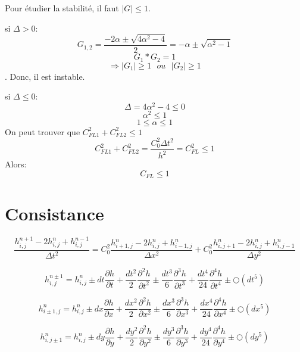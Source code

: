 \documentclass[a4paper,10pt]{report} %
\begin{document}
Pour étudier la stabilité, il faut $\big|G\big|\leq 1$.

si $\Delta > 0$:
$$G_{1,2}=\frac{-2\alpha\pm\sqrt{4\alpha^{2}-4}}{2}=-\alpha\pm\sqrt{\alpha^{2}-1}$$
$$G_{1}*G_{2}=1$$ 
$$\Longrightarrow\big|G_{1}\big|\geq1\,\,\,\,ou\,\,\,\,\big|G_{2}\big|\geq1$$. Donc, il est instable.

si $\Delta \leq 0$:
$$\Delta=4\alpha^{2}-4\leq0$$
$$\alpha^{2}\leq1$$
$$1\leq \alpha\leq1$$ On peut trouver que $C_{FL1}^{2}+C_{FL2}^{2}\leq 1 $
$$ C_{FL1}^{2}+C_{FL2}^{2}=\frac{C_{0}^{2}\Delta t^{2}}{h^{2}}=C_{FL}^{2}\leq 1$$ 
Alors:
$$C_{FL}\leq1$$



\section{Consistance}

\begin{equation}\frac{h^{n+1}_{i,j}-2h^{n}_{i,j}+h^{n-1}_{i,j}}{\Delta t^{2}}=C^{2}_{0}\frac{h^{n}_{i+1,j}-2h^{n}_{i,j}+h^{n}_{i-1,j}}{\Delta x^{2}}+C^{2}_{0}\frac{h^{n}_{i,j+1}-2h^{n}_{i,j}+h^{n}_{i,j-1}}{\Delta y^{2}}
\label{1}
\end{equation}

\begin{equation}
h^{n\pm1}_{i,j}=h^{n}_{i,j}\pm dt\frac{\partial h}{\partial t}+\frac{dt^{2}}{2}\frac{\partial^{2}h}{\partial t^{2}}\pm \frac{dt^{3}}{6}\frac{\partial^{3}h}{\partial t^{3}}+\frac{dt^{4}}{24}\frac{\partial^{4}h}{\partial t^{4}}\pm\bigcirc(dt^{5})
\end{equation}


\begin{equation}
h^{n}_{i\pm1,j}=h^{n}_{i,j}\pm dx\frac{\partial h}{\partial x}+\frac{dx^{2}}{2}\frac{\partial^{2}h}{\partial x^{2}}\pm \frac{dx^{3}}{6}\frac{\partial^{3}h}{\partial x^{3}}+\frac{dx^{4}}{24}\frac{\partial^{4}h}{\partial x^{4}}\pm\bigcirc(dx^{5})
\end{equation}


\begin{equation}
h^{n}_{i,j\pm1}=h^{n}_{i,j}\pm dy\frac{\partial h}{\partial y}+\frac{dy^{2}}{2}\frac{\partial^{2}h}{\partial y^{2}}\pm \frac{dy^{3}}{6}\frac{\partial^{3}h}{\partial y^{3}}+\frac{dy^{4}}{24}\frac{\partial^{4}h}{\partial y^{4}}\pm\bigcirc(dy^{5})
\end{equation}
\end{document}
